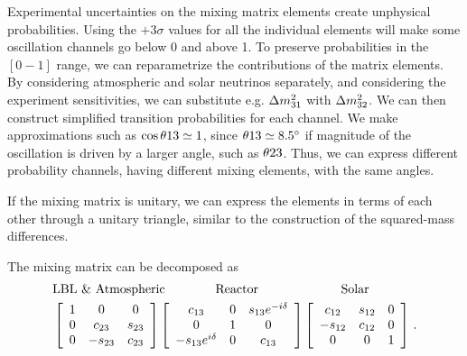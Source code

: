 \documentclass[twocolumn]{article}
\renewcommand{\th}[1][]{%
  \theta\ifx\\#1\\\else_\text{#1}\fi
}
\renewcommand{\t}[1]{\ensuremath{\text{{#1}}}}
\newcommand*{\dm}[1][]{%
  \Delta m^2\ifx\\#1\\\else_\text{#1}\fi
}
\begin{document}
Experimental uncertainties on the mixing matrix elements create unphysical probabilities. Using the $+3\sigma$ values for all the individual elements will make some oscillation channels go below 0 and above 1. To preserve probabilities in the $[0-1]$ range, we can reparametrize the contributions of the matrix elements. By considering atmospheric and solar neutrinos separately, and considering the experiment sensitivities, we can substitute e.g. $\dm[31]$ with $\dm[32]$. We can then construct simplified transition probabilities for each channel. We make approximations such as $\cos{\th{13}} \simeq 1$, since $\th{13} \simeq 8.5 ^\circ$ if magnitude of the oscillation is driven by a larger angle, such as $\th{23}$. Thus, we can express different probability channels, having different mixing elements, with the same angles. 

If the mixing matrix is unitary, we can express the elements in terms of each other through a unitary triangle, similar to the construction of the squared-mass differences.

The mixing matrix can be decomposed as 
\begin{align*}
  &\t{LBL \& Atmospheric} \hspace{1.4 cm} \t{Reactor} \hspace{2.3 cm} \t{Solar} \\
  &\left[\begin{array}{ccc}
1 & 0 & 0 \\
0 & c_{23} & s_{23} \\
0 & -s_{23} & c_{23}
\end{array}\right]\left[\begin{array}{ccc}
c_{13} & 0 & s_{13} e^{-i \delta} \\
0 & 1 & 0 \\
-s_{13} e^{i \delta} & 0 & c_{13}
\end{array}\right]\left[\begin{array}{ccc}
c_{12} & s_{12} & 0 \\
-s_{12} & c_{12} & 0 \\
0 & 0 & 1
\end{array}\right]
\,.\end{align*}
\end{document}
